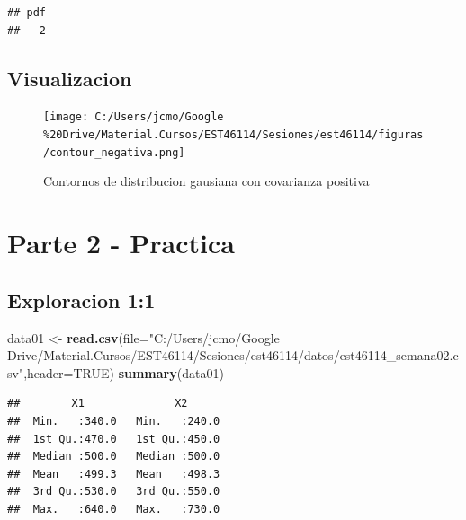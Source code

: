 \documentclass[11pt,]{article}
\newenvironment{Shaded}{\begin{snugshade}}{\end{snugshade}}
\newcommand{\KeywordTok}[1]{\textcolor[rgb]{0.13,0.29,0.53}{\textbf{#1}}}
\newcommand{\DataTypeTok}[1]{\textcolor[rgb]{0.13,0.29,0.53}{#1}}
\newcommand{\StringTok}[1]{\textcolor[rgb]{0.31,0.60,0.02}{#1}}
\newcommand{\OtherTok}[1]{\textcolor[rgb]{0.56,0.35,0.01}{#1}}
\newcommand{\OperatorTok}[1]{\textcolor[rgb]{0.81,0.36,0.00}{\textbf{#1}}}
\newcommand{\NormalTok}[1]{#1}
\begin{document}
\begin{verbatim}
## pdf 
##   2
\end{verbatim}

\subsection{Visualizacion}\label{visualizacion-6}

\begin{figure}
\centering
\texttt{[image: C:/Users/jcmo/Google\\\%20Drive/Material.Cursos/EST46114/Sesiones/est46114/figuras/contour\_negativa.png]}
\caption{Contornos de distribucion gausiana con covarianza positiva}
\end{figure}

\section{Parte 2 - Practica}\label{parte-2---practica}

\subsection{Exploracion 1:1}\label{exploracion-11}

\begin{Shaded}
\begin{Highlighting}[]
\NormalTok{data01 <-}\StringTok{ }\KeywordTok{read.csv}\NormalTok{(}\DataTypeTok{file=}\StringTok{"C:/Users/jcmo/Google Drive/Material.Cursos/EST46114/Sesiones/est46114/datos/est46114_semana02.csv"}\NormalTok{,}\DataTypeTok{header=}\OtherTok{TRUE}\NormalTok{)}
\KeywordTok{summary}\NormalTok{(data01)}
\end{Highlighting}
\end{Shaded}

\begin{verbatim}
##        X1              X2       
##  Min.   :340.0   Min.   :240.0  
##  1st Qu.:470.0   1st Qu.:450.0  
##  Median :500.0   Median :500.0  
##  Mean   :499.3   Mean   :498.3  
##  3rd Qu.:530.0   3rd Qu.:550.0  
##  Max.   :640.0   Max.   :730.0
\end{verbatim}

\begin{Shaded}
\end{Shaded}
\end{document}
